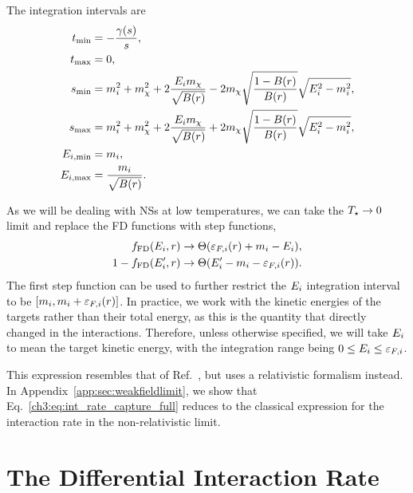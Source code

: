 The integration intervals are 
\begin{align}
    t_\mathrm{min} & = - \frac{\gamma(s)}{s},\\
    t_\mathrm{max} & = 0,\\
    s_\mathrm{min} & = m_i^2 + m_\chi^2 + 2 \frac{E_i m_\chi}{\sqrt{B(r)}} - 2m_\chi\sqrt{\frac{1 - B(r)}{B(r)}} \sqrt{E_i^2 - m_i^2}, \\
    s_\mathrm{max} & = m_i^2 + m_\chi^2 + 2 \frac{E_i m_\chi}{\sqrt{B(r)}} + 2m_\chi\sqrt{\frac{1 - B(r)}{B(r)}} \sqrt{E_i^2 - m_i^2}, \\
    E_{i,\mathrm{min}} & = m_i,\\
    E_{i,\mathrm{max}} & = \frac{m_i}{\sqrt{B(r)}}.
\end{align}

As we will be dealing with NSs at low temperatures, we can take the $T_\star\rightarrow 0$ limit and replace the FD functions with step functions, 
\begin{align}
    f_{\rm FD}(E_i, r) &\rightarrow \Theta(\varepsilon_{F,i}(r) +m_i - E_i),\\
    1 - f_{\rm FD}(E_i', r) & \rightarrow  \Theta(E_i'-m_i - \varepsilon_{F,i}(r) ).
\end{align}
The first step function can be used to further restrict the $E_i$ integration interval to be $[m_i, m_i + \varepsilon_{F,i}(r)]$. In practice, we work with the kinetic energies of the targets rather than their total energy, as this is the quantity that directly changed in the interactions. Therefore, unless otherwise specified, we will take $E_i$ to mean the target kinetic energy, with the integration range being $0\le E_i\le \varepsilon_{F,i}$.

This expression resembles that of Ref.~\cite{Garani:2018kkd_may_NewAnalysisNeutron}, but uses a relativistic formalism instead. In Appendix~\ref{app:sec:weakfieldlimit}, we show that Eq.~\ref{ch3:eq:int_rate_capture_full} reduces to the classical expression for the interaction rate in the non-relativistic limit. 


\section{The Differential Interaction Rate}
\label{ch3:sec:diff_int_rate}


